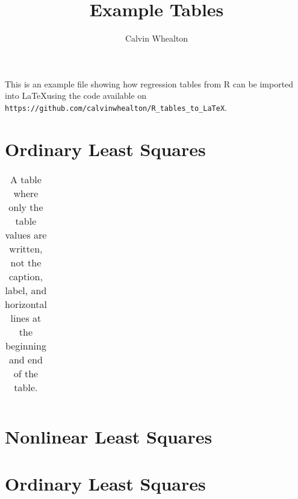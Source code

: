 \documentclass{article}
\title{Example Tables}
\author{Calvin Whealton}
\begin{document}
\maketitle

\listoftables

\newpage

This is an example file showing how regression tables from R can be imported into \LaTeX using the code available on \texttt{https://github.com/calvinwhealton/R\_tables\_to\_LaTeX}.


\section{Ordinary Least Squares}

\begin{table}[h!]
\caption{A table where only the table values are written, not the caption, label, and horizontal lines at the beginning and end of the table.}\label{ols1}
\begin{center}
\begin{tabular}{l l l l l}
\hline

\hline
\end{tabular}
\end{center}
\end{table}





\section{Nonlinear Least Squares}


\section{Ordinary Least Squares}
\end{document}
